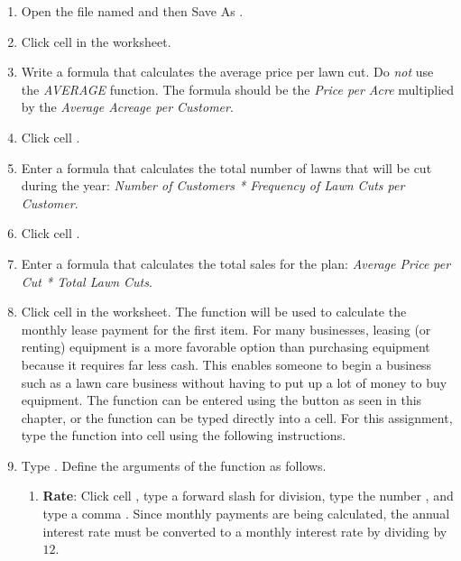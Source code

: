 \begin{enumerate}
	\item Open the file named  and then Save As .
	
	\item Click cell  in the  worksheet.

	\item Write a formula that calculates the average price per lawn cut. Do \textit{not} use the \textit{AVERAGE} function. The formula should be the \textit{Price per Acre} multiplied by the \textit{Average Acreage per Customer}.
	
	\item Click cell .
	
	\item Enter a formula that calculates the total number of lawns that will be cut during the year: \textit{Number of Customers * Frequency of Lawn Cuts per Customer}.
	
	\item Click cell .
	
	\item Enter a formula that calculates the total sales for the plan: \textit{Average Price per Cut * Total Lawn Cuts}.
	
	\item Click cell  in the  worksheet. The  function will be used to calculate the monthly lease payment for the first item. For many businesses, leasing (or renting) equipment is a more favorable option than purchasing equipment because it requires far less cash. This enables someone to begin a business such as a lawn care business without having to put up a lot of money to buy equipment. The  function can be entered using the  button as seen in this chapter, or the  function can be typed directly into a cell. For this assignment, type the function into cell  using the following instructions.
	
	\item Type . Define the arguments of the function as follows.

	\begin{enumerate}
		\item \textbf{Rate}: Click cell , type a forward slash \fmtTyping{/} for division, type the number , and type a comma \fmtTyping{,}. Since monthly payments are being calculated, the annual interest rate must be converted to a monthly interest rate by dividing by $ 12 $.
		

\end{enumerate}
\end{enumerate}
